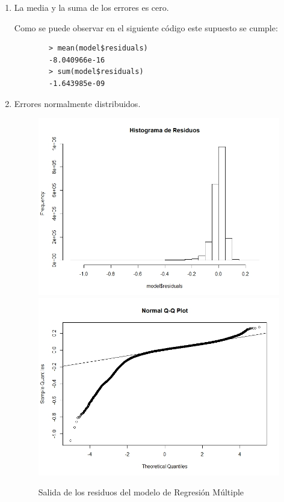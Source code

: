 \documentclass[a4paper,10pt,twocolumn]{report}
\begin{document}
	\begin{enumerate}
		\item La media y la suma de los errores es cero.
		
		Como se puede observar en el siguiente código este supuesto se cumple:
		\begin{lstlisting}
		> mean(model$residuals)
		-8.040966e-16
		> sum(model$residuals)
		-1.643985e-09
		\end{lstlisting}
		\item Errores normalmente distribuidos.	
		
		\begin{figure}[H]
			\centering
			\includegraphics[width=0.9\linewidth]{img/regression/histogram}
			\includegraphics[width=0.9\linewidth]{img/regression/normal_qq_plot}
			\label{fig:histogram}
			\caption{Salida de los residuos del modelo de Regresión Múltiple}
		\end{figure}
		

\end{enumerate}
\end{document}
